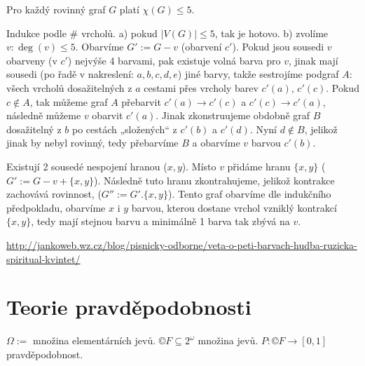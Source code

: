 \documentclass[12pt]{article}					%
\begin{document}
        \begin{veta}[O 5 barvách]
            Pro každý rovinný graf $G$ platí $\chi(G) ≤ 5$.
            \begin{dukazin}
                    Indukce podle \# vrcholů. a) pokud $|V(G)| ≤ 5$, tak je hotovo. b) zvolíme $v: \deg(v) ≤ 5$. Obarvíme $G' := G-v$ (obarvení $c'$). Pokud jsou sousedi $v$ obarveny (v $c'$) nejvýše 4 barvami, pak existuje volná barva pro $v$, jinak mají sousedi (po řadě v nakreslení: $a, b, c, d, e$) jiné barvy, takže sestrojíme podgraf $A:$ všech vrcholů dosažitelných z $a$ cestami přes vrcholy barev $c'(a)$, $c'(c)$. Pokud $c \notin A$, tak můžeme graf $A$ přebarvit $c'(a) \rightarrow c'(c)$ a $c'(c) \rightarrow c'(a)$, následně můžeme $v$ obarvit $c'(a)$. Jinak zkonstruujeme obdobně graf $B$ dosažitelný z $b$ po cestách „složených“ z $c'(b)$ a $c'(d)$. Nyní $d \notin B$, jelikož jinak by nebyl rovinný, tedy přebarvíme $B$ a obarvíme $v$ barvou $c'(b)$.
            \end{dukazin}
            
            \begin{dukazin}[Podobná indukce, jinak vyřešíme $\deg(v) = 5$]
                Existují 2 sousedé nespojení hranou ($x, y$). Místo $v$ přidáme hranu $\{x, y\}$ ($G':=G-v+\{x, y\}$). Následně tuto hranu zkontrahujeme, jelikož kontrakce zachovává rovinnost, ($G'':=G'.\{x, y\}$). Tento graf obarvíme dle indukčního předpokladu, obarvíme $x$ i $y$ barvou, kterou dostane vrchol vzniklý kontrakcí $\{x, y\}$, tedy mají stejnou barvu a minimálně 1 barva tak zbývá na $v$.
            \end{dukazin}

            \begin{dukazin}
                \href{http://jankoweb.wz.cz/blog/pisnicky-odborne/veta-o-peti-barvach-hudba-ruzicka-spiritual-kvintet/}{http://jankoweb.wz.cz/blog/pisnicky-odborne/veta-o-peti-barvach-hudba-ruzicka-spiritual-kvintet/}
            \end{dukazin}
        \end{veta}

\section{Teorie pravděpodobnosti}
    \begin{definice}
        $\Omega :=$ množina elementárních jevů. $©F \subseteq 2^{\omega}$ množina jevů. $P: ©F \rightarrow [0, 1]$ pravděpodobnost.
    \end{definice}
\end{document}
